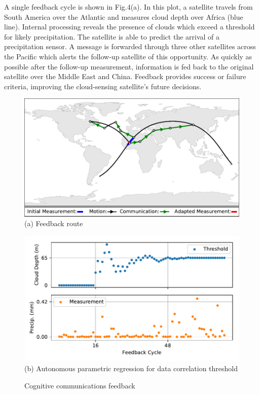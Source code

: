\documentclass[conference]{IEEEtran}
\begin{document}
A single feedback cycle is shown in Fig.4(a).  In this plot, a satellite travels
from South America over the Atlantic and measures cloud depth over Africa (blue
line).  Internal processing reveals the presence of clouds which exceed a
threshold for likely precipitation.  The satellite is able to predict the
arrival of a precipitation sensor.  A message is forwarded through three other
satellites across the Pacific which alerts the follow-up satellite of this
opportunity.  As quickly as possible after the follow-up measurement,
information is fed back to the original satellite over the Middle East and
China.  Feedback provides success or failure criteria, improving the
cloud-sensing satellite's future decisions.



\begin{figure}[t!]
  \begin{minipage}[b]{\linewidth}
    \begin{center}
      \includegraphics[width=\textwidth]{images/loop.pdf}
      {\footnotesize(a) Feedback route}
    \end{center}
    \medskip
  \end{minipage}
  \begin{minipage}[b]{\linewidth}
    \begin{center}
      \includegraphics[width=\textwidth]{images/regression.pdf}
      {\footnotesize(b) Autonomous parametric regression for data correlation
        threshold}
    \end{center}
  \end{minipage}
  \caption{Cognitive communications feedback}
  \label{fig:feedback}
\end{figure}
\end{document}
